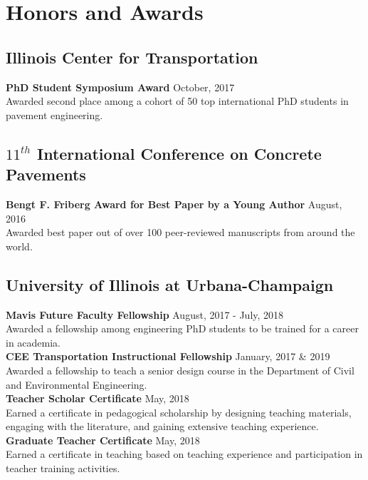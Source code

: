 \documentclass[12pt]{article}
\begin{document}
\bigskip
\section*{Honors and Awards}
\hfill
\subsection*{Illinois Center for Transportation}
\textbf{PhD Student Symposium Award} \hfill October, 2017 \\
Awarded second place among a cohort of 50 top international PhD students in pavement engineering. \\

\subsection*{$11^{th}$ International Conference on Concrete Pavements}
\textbf{Bengt F. Friberg Award for Best Paper by a Young Author} \hfill August, 2016  \\
Awarded best paper out of over 100 peer-reviewed manuscripts from around the world. \\

\subsection*{University of Illinois at Urbana-Champaign} 
\textbf{Mavis Future Faculty Fellowship} \hfill August, 2017 - July, 2018 \\
Awarded a fellowship among engineering PhD students to be trained for a career in academia. \\

\textbf{CEE Transportation Instructional Fellowship} \hfill January, 2017 \& 2019 \\
Awarded a fellowship to teach a senior design course in the Department of Civil and Environmental Engineering. \\

\textbf{Teacher Scholar Certificate} \hfill May, 2018 \\
Earned a certificate in pedagogical scholarship by designing teaching materials, engaging with the literature, and gaining extensive teaching experience. \\

\textbf{Graduate Teacher Certificate} \hfill May, 2018 \\
Earned a certificate in teaching based on teaching experience and participation in teacher training activities. \\
\end{document}
